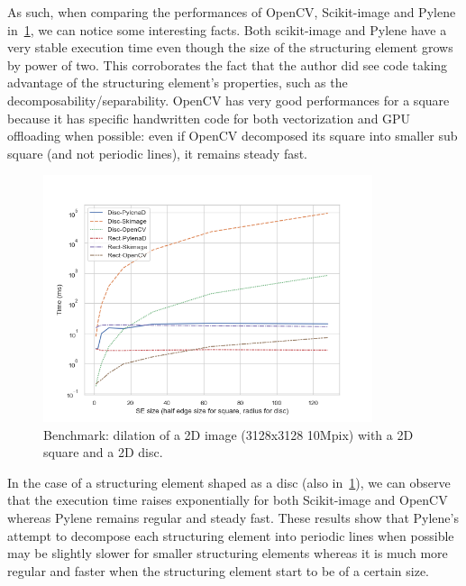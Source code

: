 As such, when comparing the performances of OpenCV, Scikit-image and Pylene in~\cref{fig:gen.bench.square.disc}, we can
notice some interesting facts. Both scikit-image and Pylene have a very stable execution time even though the size of
the structuring element grows by power of two. This corroborates the fact that the author did see code taking advantage
of the structuring element's properties, such as the decomposability/separability. OpenCV has very good performances for
a square because it has specific handwritten code for both vectorization and GPU offloading when possible: even if
OpenCV decomposed its square into smaller sub square (and not periodic lines), it remains steady fast.

\begin{figure}[htb]
  \centering
  \includegraphics[width=3.8in]{figs/bench_disc_rect_by_SE}
  \caption{Benchmark: dilation of a 2D image (3128x3128 \eqmark 10Mpix) with a 2D square and a 2D disc. }
  \label{fig:gen.bench.square.disc}
\end{figure}



In the case of a structuring element shaped as a disc (also in~\cref{fig:gen.bench.square.disc}), we can observe that
the execution time raises exponentially for both Scikit-image and OpenCV whereas Pylene remains regular and steady fast.
These results show that Pylene's attempt to decompose each structuring element into periodic lines when possible may be
slightly slower for smaller structuring elements whereas it is much more regular and faster when the structuring element
start to be of a certain size.


